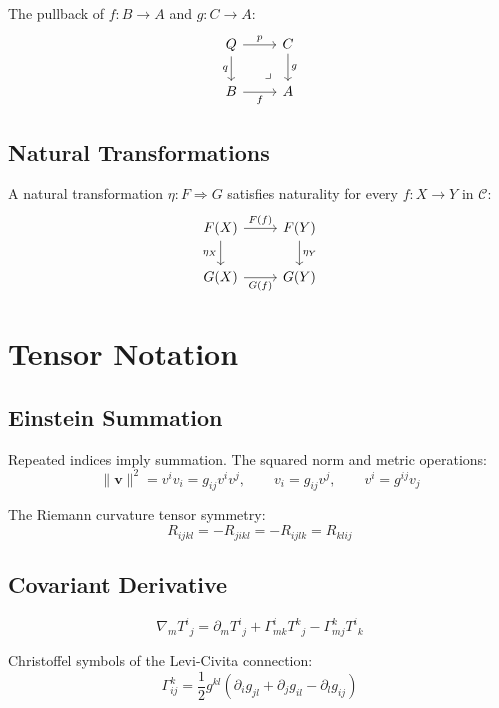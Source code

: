 \documentclass[
    language=english,
    doctype=article,
    institution=none,
    titlestyle=book,
]{../../omnilatex}
\theoremstyle{plain}
\theoremstyle{definition}
\theoremstyle{remark}
\begin{document}
The pullback of $f\colon B \to A$ and $g\colon C \to A$:
\[
    \begin{tikzcd}
        Q \arrow[r, "p"] \arrow[d, "q"'] \arrow[dr, phantom, "\lrcorner" near end]
            & C \arrow[d, "g"] \\
        B \arrow[r, "f"'] & A
    \end{tikzcd}
\]

\subsection{Natural Transformations}

A natural transformation $\eta\colon F \Rightarrow G$ satisfies naturality for every
$f\colon X \to Y$ in $\mathcal{C}$:
\[
    \begin{tikzcd}
        F(X) \arrow[r, "F(f)"] \arrow[d, "\eta_X"'] & F(Y) \arrow[d, "\eta_Y"] \\
        G(X) \arrow[r, "G(f)"'] & G(Y)
    \end{tikzcd}
\]

\section{Tensor Notation}
\label{sec:tensor-notation}

\subsection{Einstein Summation}

Repeated indices imply summation. The squared norm and metric operations:
\[
    \|\mathbf{v}\|^2 = v^i v_i = g_{ij} v^i v^j, \qquad
    v_i = g_{ij} v^j, \qquad v^i = g^{ij} v_j
\]

The Riemann curvature tensor symmetry:
\[
    R_{ijkl} = -R_{jikl} = -R_{ijlk} = R_{klij}
\]

\subsection{Covariant Derivative}

\[
    \nabla_m T^i{}_j = \partial_m T^i{}_j + \Gamma^i_{mk} T^k{}_j - \Gamma^k_{mj} T^i{}_k
\]

Christoffel symbols of the Levi-Civita connection:
\[
    \Gamma^k_{ij} = \frac{1}{2} g^{kl}\left(\partial_i g_{jl} + \partial_j g_{il} - \partial_l g_{ij}\right)
\]
\end{document}
